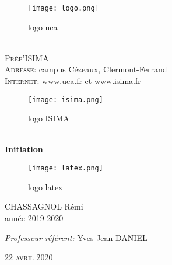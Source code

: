\documentclass[a4paper]{article}
\begin{document}
\begin{titlepage}
  \begin{center}
    
    \begin{figure}[h]
      \centering
      \texttt{[image: logo.png]}
      \caption{logo uca}
      \label{uca}
    \end{figure}
    \\[1.5cm]
    \textsc{\LARGE Prép'ISIMA}\\[0.5cm]
    
    \textsc{Adresse:} campus Cézeaux, Clermont-Ferrand\\
    \textsc{Internet:} www.uca.fr et www.isima.fr\\[0.5cm]

    \begin{figure}[h]
      \centering
      \texttt{[image: isima.png]}
      \caption{logo ISIMA}
      \label{isima}
    \end{figure}\\[1cm]
    
    {\huge \bfseries Initiation\\[0.4cm]}

    \begin{figure}[h]
      \centering
      \texttt{[image: latex.png]}
      \caption{logo latex}
      \label{latex}
    \end{figure}

    \begin{minipage}{0.9\textwidth}
      \begin{flushleft} \large
        CHASSAGNOL Rémi\\
        année 2019-2020\\[2cm]
      \end{flushleft}
    \end{minipage}

    \begin{minipage}{0.9\textwidth}
      \begin{flushright} \large
        \emph{Professeur référent:} Yves-Jean DANIEL\\
      \end{flushright}
    \end{minipage}

    \textsc{22 avril 2020}

  \end{center}
\end{titlepage}
\end{document}
